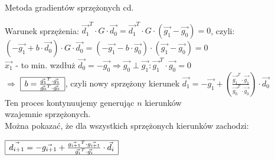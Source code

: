   \begin{frame}{Metoda gradientów sprzężonych cd. }

   \begin{block}{}
	  Warunek sprzężenia: $\vec{d_1}^T \cdot G \cdot \vec{d_0} = \vec{d_1}^T \cdot G \cdot (\vec{g_1} - \vec{g_0}) = 0$, czyli:
	  $(-\vec{g_1} + b \cdot \vec{d_0}) \cdot G \cdot \vec{d_0} = (-\vec{g_1} -b \cdot \vec{g_0}) \cdot (\vec{g_1} - \vec{g_0}) = 0$
	  \\$\vec{x_1}$ - to min. wzdłuż $\vec{d_0} = -\vec{g_0} \Rightarrow \vec{g_0} \perp \vec{g_1} : \vec{g_1}^T \cdot \vec{g_0} = 0$
	  \smallskip
	  \\$\Rightarrow$
	  $\begin{array}{|c|}
 	   	 \hline
 	   	    b = \frac{\vec{g_1}^T \cdot \vec{g_1}}{\vec{g_0}^T \cdot \vec{g_0}}
 	   	 \\ \hline
	  \end{array}$,
 	  czyli nowy sprzężony kierunek $\vec{d_1} = -\vec{g_1} + \left(\frac{\vec{g_1}^T \cdot \vec{g_1}}{\vec{g_0}^T \cdot \vec{g_0}}\right) \cdot \vec{d_0} $
 	  \medskip
 	  \\Ten proces kontynuujemy generując $n$ kierunków \\ wzajemnie sprzężonych.
 	  \medskip
 	  \\Można pokazać, że dla wszystkich sprzężonych kierunków zachodzi:
 	  \begin{center}
 	  	 $\begin{array}{|c|}
 	   	   \hline
 	   	      \vec{d_{i+1}} = -\vec{g_{i+1}} + \frac{\vec{g_{i+1}}^T \cdot \vec{g_{i+1}}}{\vec{g_{i}}^T \cdot \vec{g_{i}}} \cdot \vec{d_i}
 	   	   \\ \hline
	    \end{array}$
 	  \end{center}
 	\end{block}

  \end{frame}
